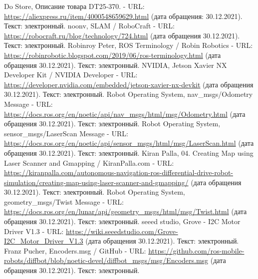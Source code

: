 \documentclass[12pt,a4paper]{scrartcl}
\begin{document}
\begin{thebibliography}{13}
                 Do Store, Описание товара DT25-370. - URL: \url{https://aliexpress.ru/item/4000548659629.html} (дата обращения: 30.12.2021). Текст: электронный.
                 noonv, SLAM / RoboCraft - URL: \url{https://robocraft.ru/blog/technology/724.html} (дата обращения 30.12.2021). Текст: электронный.
                 Robinroy Peter, ROS Terminology / Robin Robotics - URL: \url{https://robinrobotic.blogspot.com/2019/06/ros-terminology.html} (дата обращения 30.12.2021). Текст: электронный.
                 NVIDIA, Jetson Xavier NX Developer Kit / NVIDIA Developer - URL: \url{https://developer.nvidia.com/embedded/jetson-xavier-nx-devkit} (дата обращения 30.12.2021). Текст: электронный.
                 Robot Operating System, nav\_msgs/Odometry Message - URL: \url{https://docs.ros.org/en/noetic/api/nav_msgs/html/msg/Odometry.html} (дата обращения 30.12.2021). Текст: электронный.
                 Robot Operating System, sensor\_msgs/LaserScan Message - URL: \url{https://docs.ros.org/en/noetic/api/sensor_msgs/html/msg/LaserScan.html} (дата обращения 30.12.2021). Текст: электронный.
                 Kiran Palla, 04. Creating Map using Laser Scanner and Gmapping / 	KiranPalla.com - URL: \url{https://kiranpalla.com/autonomous-navigation-ros-differential-drive-robot-simulation/creating-map-using-laser-scanner-and-gmapping/} (дата обращения 30.12.2021). Текст: электронный.
                 Robot Operating System, geometry\_msgs/Twist Message - URL: \url{https://docs.ros.org/en/lunar/api/geometry_msgs/html/msg/Twist.html} (дата обращения 30.12.2021). Текст: электронный.
                 seeed studio, Grove - I2C Motor Driver V1.3 - URL: \url{https://wiki.seeedstudio.com/Grove-I2C_Motor_Driver_V1.3} (дата обращения 30.12.2021). Текст: электронный.
                  Franz Pucher, Encoders.msg / GitHub - URL: \url{https://github.com/ros-mobile-robots/diffbot/blob/noetic-devel/diffbot_msgs/msg/Encoders.msg} (дата обращения 30.12.2021). Текст: электронный.
	\end{thebibliography}
\end{document}
